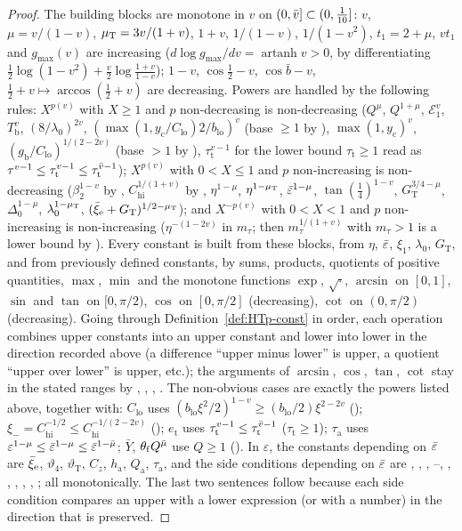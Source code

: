 \begin{proof}
The building blocks are monotone in $v$ on $(0,\bar v]\subset(0,\frac1{10}]$: $v$, $\mu=v/(1-v)$, $\mu_{\mathrm T}=3v/(1+v)$, $1+v$, $1/(1-v)$,
$1/(1-v^2)$, $t_1=2+\mu$, $vt_1$ and $g_{\max}(v)$ are increasing ($d\log g_{\max}/dv=\operatorname{artanh}v>0$, by differentiating
$\frac12\log(1-v^2)+\frac v2\log\frac{1+v}{1-v}$); $1-v$, $\cos\frac12-v$, $\cos\bar b-v$, $\frac12+v\mapsto\arccos(\frac12+v)$ are decreasing.
Powers are handled by the following rules: $X^{p(v)}$ with $X\ge1$ and $p$ non-decreasing is non-decreasing ($Q^\mu$, $Q^{1+\mu}$,
$\mathcal E_1^v$, $T_{\mathrm b}^v$, $(8/\lambda_0)^{2v}$, $(\max(1,y_{\mathrm c}/C_{\mathrm{lo}})2/b_{\mathrm{lo}})^v$ (base $\ge1$ by
), $\max(1,y_{\mathrm c})^{v}$, $(g_{\mathrm b}/C_{\mathrm{lo}})^{1/(2-2v)}$ (base $>1$ by ), $\tau_{\mathrm t}^{v-1}$
for the lower bound $\tau_{\mathrm t}\ge1$ read as $\tau^{v-1}\le\tau_{\mathrm t}^{v-1}\le\tau_{\mathrm t}^{\bar v-1}$); $X^{p(v)}$ with
$0<X\le1$ and $p$ non-increasing is non-decreasing ($\beta_2^{1-v}$ by , $C_{\mathrm{hi}}^{1/(1+v)}$ by ,
$\eta^{1-\mu}$, $\eta^{1-\mu_{\mathrm T}}$, $\bar\varepsilon^{1-\mu}$, $\tan(\frac14)^{1-v}$, $G_{\mathrm T}^{3/4-\mu}$, $\Delta_0^{1-\mu}$,
$\lambda_0^{1-\mu_{\mathrm T}}$, $(\bar\xi_{\mathrm e}+G_{\mathrm T})^{1/2-\mu_{\mathrm T}}$); and $X^{-p(v)}$ with $0<X<1$ and $p$ non-increasing is non-increasing
($\eta^{-(1-2v)}$ in $m_\tau$; then $m_\tau^{1/(1+v)}$ with $m_\tau>1$ is a lower bound by ). Every constant is built from these
blocks, from $\eta$, $\bar\varepsilon$, $\xi_1$, $\lambda_0$, $G_{\mathrm T}$, and from previously defined constants, by sums, products, quotients of
positive quantities, $\max$, $\min$ and the monotone functions $\exp$, $\sqrt{\cdot}$, $\arcsin$ on $[0,1]$, $\sin$ and $\tan$ on
$[0,\pi/2)$, $\cos$ on $[0,\pi/2]$ (decreasing), $\cot$ on $(0,\pi/2)$ (decreasing). Going through Definition~\ref{def:HTp-const} in
order, each operation combines upper constants into an upper constant and lower into lower in the direction recorded above (a
difference ``upper minus lower'' is upper, a quotient ``upper over lower'' is upper, etc.); the arguments of $\arcsin$, $\cos$, $\tan$,
$\cot$ stay in the stated ranges by , , , . The non-obvious cases are exactly the powers listed above,
together with: $C_{\mathrm{lo}}$ uses $(b_{\mathrm{lo}}\xi^2/2)^{1-v}\ge(b_{\mathrm{lo}}/2)\xi^{2-2v}$ (); $\xi_-=C_{\mathrm{hi}}^{-1/2}
\le C_{\mathrm{hi}}^{-1/(2-2v)}$ (); $e_{\mathrm t}$ uses $\tau_{\mathrm t}^{v-1}\le\tau_{\mathrm t}^{\bar v-1}$
($\tau_{\mathrm t}\ge1$); $\tau_{\mathrm a}$ uses $\varepsilon^{1-\mu}\le\bar\varepsilon^{1-\mu}\le\bar\varepsilon^{1-\bar\mu}$; $\bar Y$, $\theta_{\mathrm f}Q^{\bar\mu}$
use $Q\ge1$ (). In $\varepsilon$, the constants depending on $\bar\varepsilon$ are $\bar\xi_{\mathrm e}$, $\vartheta_4$, $\vartheta_{\mathrm T}$, $C_z$,
$h_{\mathrm a}$, $Q_{\mathrm a}$, $\tau_{\mathrm a}$, and the side conditions depending on $\bar\varepsilon$ are , , ,
--, , , , , , ; all monotonically. The last two sentences follow because each side condition
compares an upper with a lower expression (or with a number) in the direction that is preserved.
\end{proof}


